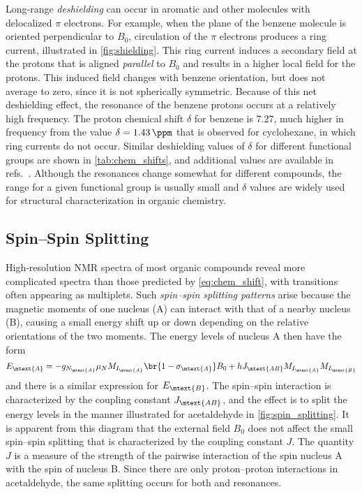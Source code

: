 Long-range \emph{deshielding} can occur in aromatic and other molecules with delocalized \( \pi \) electrons. 
For example, when the plane of the benzene molecule is oriented perpendicular to \( B_0 \), circulation of the \( \pi \) electrons produces a ring current, illustrated in \cref{fig:shielding}. 
This ring current induces a secondary field at the protons that is aligned \emph{parallel} to \( B_0 \) and results in a higher local field for the protons. 
This induced field changes with benzene orientation, but does not average to zero, since it is not spherically symmetric. 
Because of this net deshielding effect, the resonance of the benzene protons occurs at a relatively high frequency. 
The proton chemical shift \( \delta  \) for benzene is \SI{7.27}{\ppm}, much higher in frequency from the value \( \delta = \SI{1.43}{\ppm} \) that is observed for cyclohexane, in which ring currents do not occur. 
Similar deshielding values of \( \delta \) for different functional groups are shown in \cref{tab:chem_shifts}, and additional values are available in refs.~\autocite{davis1965advanced,pople1959nmr,silverstein2005spec,sdbs2020,aldrich1993nmr}.
Although the resonances change somewhat for different compounds, the range for a given functional group is usually small and \( \delta \) values are widely used for structural characterization in organic chemistry. 



\subsection{Spin--Spin Splitting} %
\label{sub:spin_spin_splitting}

High-resolution NMR spectra of most organic compounds reveal more complicated spectra than those predicted by \cref{eq:chem_shift}, with transitions often appearing as multiplets.
Such \emph{spin--spin splitting patterns} arise because the magnetic moments of one nucleus (A) can interact with that of a nearby nucleus (B), causing a small energy shift up or down depending on the relative orientations of the two moments. 
The energy levels of nucleus A then have the form 
\begin{equation}
	E_\mtext{A} = -g_{N_\mtext{A}} \mu_N M_{I_\mtext{A}} \br{1-\sigma_\mtext{A}} B_0
		+ h J_\mtext{AB} M_{I_\mtext{A}} M_{I_\mtext{B}}
	\label{eq:j_coupling}
\end{equation}
and there is a similar expression for \( E_\mtext{B} \). 
The spin--spin interaction is characterized by the coupling constant \( J_\mtext{AB} \), and the effect is to split the energy levels in the manner illustrated for acetaldehyde in \cref{fig:spin_splitting}. 
It is apparent from this diagram that the external field \( B_0 \) does not affect the small spin--spin splitting that is characterized by the coupling constant \( J \). 
The quantity \( J \) is a measure of the strength of the pairwise interaction of the spin nucleus A with the spin of nucleus B. 
Since there are only proton--proton interactions in acetaldehyde, the same splitting occurs for both  and  resonances. 

